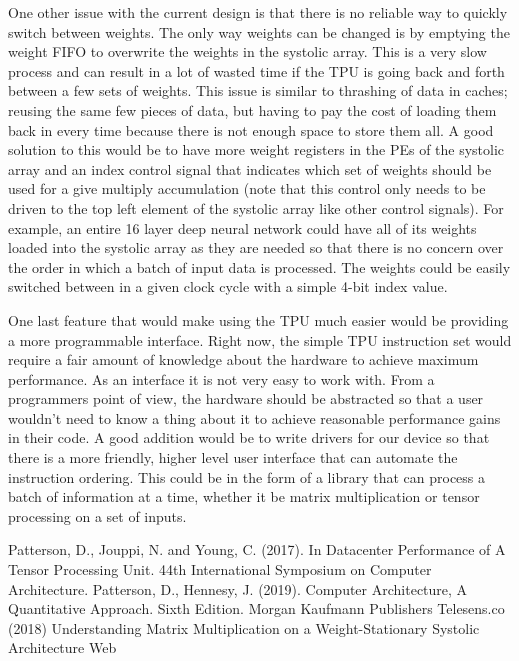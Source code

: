 \documentclass[11pt, conference, onecolumn]{IEEEtran}
\begin{document}
    One other issue with the current design is that there is no reliable way to quickly
    switch between weights. The only way weights can be changed is by emptying the weight
    FIFO to overwrite the weights in the systolic array. This is a very slow process and
    can result in a lot of wasted time if the TPU is going back and forth between a few
    sets of weights. This issue is similar to thrashing of data in caches; reusing the
    same few pieces of data, but having to pay the cost of loading them back in every time
    because there is not enough space to store them all. A good solution to this would be
    to have more weight registers in the PEs of the systolic array and an index control
    signal that indicates which set of weights should be used for a give multiply
    accumulation (note that this control only needs to be driven to the top left element
    of the systolic array like other control signals). For example, an entire 16 layer
    deep neural network could have all of its weights loaded into the systolic array as
    they are needed so that there is no concern over the order in which a batch of input
    data is processed. The weights could be easily switched between in a given clock cycle
    with a simple 4-bit index value.

    One last feature that would make using the TPU much easier would be providing a more
    programmable interface. Right now, the simple TPU instruction set would require a fair
    amount of knowledge about the hardware to achieve maximum performance. As an interface
    it is not very easy to work with. From a programmers point of view, the hardware
    should be abstracted so that a user wouldn’t need to know a thing about it to achieve
    reasonable performance gains in their code. A good addition would be to write drivers
    for our device so that there is a more friendly, higher level user interface that can
    automate the instruction ordering. This could be in the form of a library that can
    process a batch of information at a time, whether it be matrix multiplication or
    tensor processing on a set of inputs.

\begin{thebibliography}{00}
 Patterson, D., Jouppi, N. and Young, C. (2017). In Datacenter Performance of A Tensor Processing Unit. 44th International Symposium on Computer Architecture.
 Patterson, D., Hennesy, J. (2019). Computer Architecture, A Quantitative Approach. Sixth Edition. Morgan Kaufmann Publishers
 Telesens.co (2018) Understanding Matrix Multiplication on a Weight-Stationary Systolic Architecture Web
\end{thebibliography}
\end{document}
